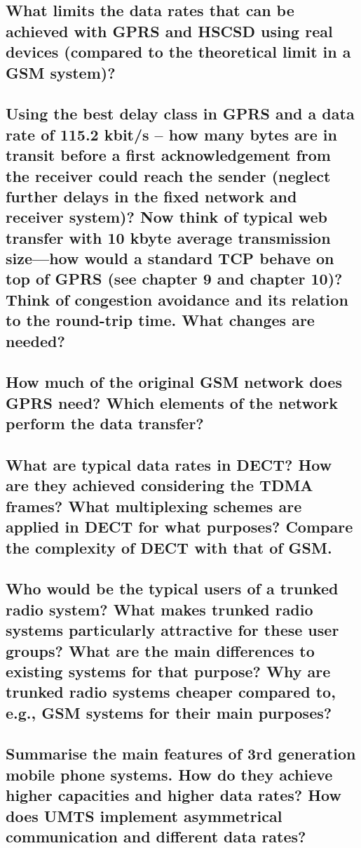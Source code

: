 \subsection{What limits the data rates that can be achieved with GPRS and HSCSD using real devices (compared to the theoretical limit in a GSM system)?}

\subsection{Using the best delay class in GPRS and a data rate of 115.2 kbit/s – how many bytes are in transit before a first acknowledgement from the receiver could reach the sender (neglect further delays in the fixed network and receiver system)? Now think of typical web transfer with 10 kbyte average transmission size—how would a standard TCP behave on top of GPRS (see chapter 9 and chapter 10)? Think of congestion avoidance and its relation to the round-trip time. What changes are needed?}

\subsection{How much of the original GSM network does GPRS need? Which elements of the network perform the data transfer?}

\subsection{What are typical data rates in DECT? How are they achieved considering the TDMA frames? What multiplexing schemes are applied in DECT for what purposes? Compare the complexity of DECT with that of GSM.}

\subsection{Who would be the typical users of a trunked radio system? What makes trunked radio systems particularly attractive for these user groups? What are the main differences to existing systems for that purpose? Why are trunked radio systems cheaper compared to, e.g., GSM systems for their main purposes?}

\subsection{Summarise the main features of 3rd generation mobile phone systems. How do they achieve higher capacities and higher data rates? How does UMTS implement asymmetrical communication and different data rates?}

